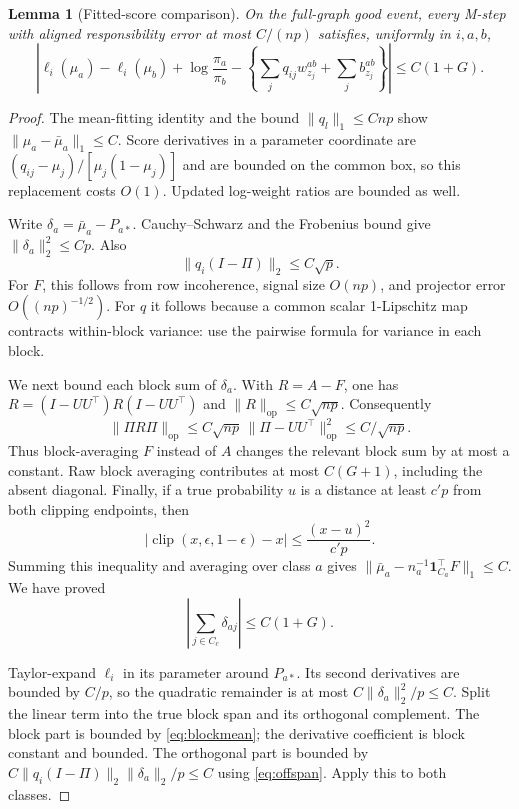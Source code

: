 \documentclass[11pt]{article}
\newtheorem{lemma}[theorem]{Lemma}
\newcommand{\one}{\mathbf 1}
\newcommand{\op}{\mathrm{op}}
\newcommand{\clip}{\operatorname{clip}}
\begin{document}
\begin{lemma}[Fitted-score comparison]\label{lem:fit}
On the full-graph good event, every M-step with aligned responsibility error at most $C/(np)$ satisfies, uniformly in $i,a,b$,
\begin{equation}\label{eq:fit-comparison}
 \left|\ell_i(\mu_a)-\ell_i(\mu_b)+\log\frac{\pi_a}{\pi_b}
 -\left\{\sum_jq_{ij}w_{z_j}^{ab}+\sum_jb_{z_j}^{ab}\right\}\right|
 \le C(1+G).
\end{equation}
\end{lemma}
\begin{proof}
The mean-fitting identity and the bound $\|q_l\|_1\le Cnp$ show $\|\mu_a-\bar\mu_a\|_1\le C$. Score derivatives in a parameter coordinate are $(q_{ij}-\mu_j)/[\mu_j(1-\mu_j)]$ and are bounded on the common box, so this replacement costs $O(1)$. Updated log-weight ratios are bounded as well.

Write $\delta_a=\bar\mu_a-P_{a*}$. Cauchy--Schwarz and the Frobenius bound give $\|\delta_a\|_2^2\le Cp$. Also
\begin{equation}\label{eq:offspan}
 \|q_i(I-\Pi)\|_2\le C\sqrt p.
\end{equation}
For $F$, this follows from row incoherence, signal size $O(np)$, and projector error $O((np)^{-1/2})$. For $q$ it follows because a common scalar 1-Lipschitz map contracts within-block variance: use the pairwise formula for variance in each block.

We next bound each block sum of $\delta_a$. With $R=A-F$, one has $R=(I-UU^\top)R(I-UU^\top)$ and $\|R\|_\op\le C\sqrt{np}$. Consequently
\[
 \|\Pi R\Pi\|_\op\le C\sqrt{np}\,\|\Pi-UU^\top\|_\op^2
 \le C/\sqrt{np}.
\]
Thus block-averaging $F$ instead of $A$ changes the relevant block sum by at most a constant. Raw block averaging contributes at most $C(G+1)$, including the absent diagonal. Finally, if a true probability $u$ is a distance at least $c'p$ from both clipping endpoints, then
\[
 |\clip(x,\epsilon,1-\epsilon)-x|\le\frac{(x-u)^2}{c'p}.
\]
Summing this inequality and averaging over class $a$ gives $\|\bar\mu_a-n_a^{-1}\one_{C_a}^\top F\|_1\le C$. We have proved
\begin{equation}\label{eq:blockmean}
 \left|\sum_{j\in C_c}\delta_{aj}\right|\le C(1+G).
\end{equation}

Taylor-expand $\ell_i$ in its parameter around $P_{a*}$. Its second derivatives are bounded by $C/p$, so the quadratic remainder is at most $C\|\delta_a\|_2^2/p\le C$. Split the linear term into the true block span and its orthogonal complement. The block part is bounded by \eqref{eq:blockmean}; the derivative coefficient is block constant and bounded. The orthogonal part is bounded by $C\|q_i(I-\Pi)\|_2\|\delta_a\|_2/p\le C$ using \eqref{eq:offspan}. Apply this to both classes.
\end{proof}
\end{document}
